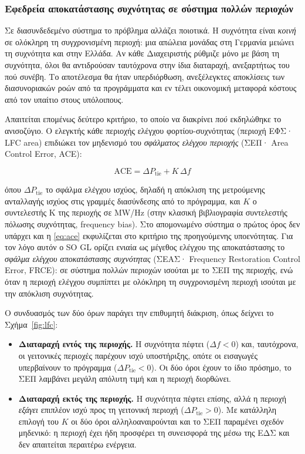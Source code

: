 \subsubsection*{Εφεδρεία αποκατάστασης συχνότητας σε σύστημα πολλών περιοχών}

Σε διασυνδεδεμένο σύστημα το πρόβλημα αλλάζει ποιοτικά. Η συχνότητα είναι \emph{κοινή} σε
ολόκληρη τη συγχρονισμένη περιοχή: μια απώλεια μονάδας στη Γερμανία μειώνει τη συχνότητα και
στην Ελλάδα. Αν κάθε Διαχειριστής ρύθμιζε μόνο με βάση τη συχνότητα, όλοι θα αντιδρούσαν
ταυτόχρονα στην ίδια διαταραχή, ανεξαρτήτως του πού συνέβη. Το αποτέλεσμα θα ήταν
υπερδιόρθωση, ανεξέλεγκτες αποκλίσεις των διασυνοριακών ροών από τα προγράμματα και εν τέλει
οικονομική μεταφορά κόστους από τον υπαίτιο στους υπόλοιπους.

Απαιτείται επομένως δεύτερο κριτήριο, το οποίο να διακρίνει \emph{πού} εκδηλώθηκε το
ανισοζύγιο. Ο ελεγκτής κάθε περιοχής ελέγχου φορτίου-συχνότητας (περιοχή ΕΦΣ· LFC area) επιδιώκει τον
μηδενισμό του \emph{σφάλματος ελέγχου περιοχής} (ΣΕΠ· Area Control Error, ACE):

\begin{equation}
\mathrm{ACE} = \Delta P_{\mathrm{tie}} + K \, \Delta f
\label{eq:ace}
\end{equation}

όπου $\Delta P_{\mathrm{tie}}$ το σφάλμα ελέγχου ισχύος, δηλαδή η απόκλιση της μετρούμενης
ανταλλαγής ισχύος στις γραμμές διασύνδεσης από το πρόγραμμα, και $K$ ο συντελεστής K της
περιοχής σε MW/Hz (στην κλασική βιβλιογραφία συντελεστής πόλωσης συχνότητας, frequency
bias). Στο απομονωμένο σύστημα ο πρώτος όρος δεν υπάρχει και η \eqref{eq:ace} εκφυλίζεται
στο κριτήριο της προηγούμενης υποενότητας. Για τον λόγο αυτόν ο SO GL ορίζει ενιαία ως
μέγεθος ελέγχου της αποκατάστασης το \emph{σφάλμα ελέγχου αποκατάστασης συχνότητας} (ΣΕΑΣ·
Frequency Restoration Control Error, FRCE): σε σύστημα πολλών περιοχών ισούται με το ΣΕΠ
της περιοχής, ενώ όταν η περιοχή ελέγχου συμπίπτει με ολόκληρη τη συγχρονισμένη περιοχή
ισούται με την απόκλιση συχνότητας.

Ο συνδυασμός των δύο όρων παράγει την επιθυμητή διάκριση, όπως δείχνει το
Σχήμα~\ref{fig:lfc}:

\begin{itemize}
\item \textbf{Διαταραχή εντός της περιοχής.} Η συχνότητα πέφτει ($\Delta f < 0$) και,
      ταυτόχρονα, οι γειτονικές περιοχές παρέχουν ισχύ υποστήριξης, οπότε οι εισαγωγές υπερβαίνουν το
      πρόγραμμα ($\Delta P_{\mathrm{tie}} < 0$). Οι δύο όροι έχουν το ίδιο πρόσημο, το ΣΕΠ
      λαμβάνει μεγάλη απόλυτη τιμή και η περιοχή διορθώνει.
\item \textbf{Διαταραχή εκτός της περιοχής.} Η συχνότητα πέφτει επίσης, αλλά η περιοχή
      \emph{εξάγει} επιπλέον ισχύ προς τη γειτονική περιοχή ($\Delta P_{\mathrm{tie}} > 0$). Με
      κατάλληλη επιλογή του $K$ οι δύο όροι αλληλοαναιρούνται και το ΣΕΠ παραμένει σχεδόν
      μηδενικό: η περιοχή έχει ήδη προσφέρει τη συνεισφορά της μέσω της ΕΔΣ και δεν
      απαιτείται περαιτέρω ενέργεια.
\end{itemize}

